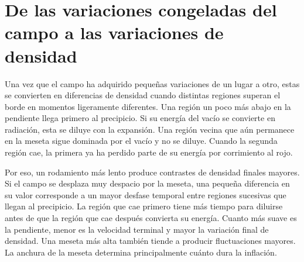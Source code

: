 \begin{classroomqa}
\end{classroomqa}

\begin{classroomqa}
\end{classroomqa}

\section{De las variaciones congeladas del campo a las variaciones de densidad}

Una vez que el campo ha adquirido pequeñas variaciones de un lugar a otro, estas se convierten en diferencias de densidad cuando distintas regiones superan el borde en momentos ligeramente diferentes. Una región un poco más abajo en la pendiente llega primero al precipicio. Si su energía del vacío se convierte en radiación, esta se diluye con la expansión. Una región vecina que aún permanece en la meseta sigue dominada por el vacío y no se diluye. Cuando la segunda región cae, la primera ya ha perdido parte de su energía por corrimiento al rojo.

Por eso, un rodamiento más lento produce contrastes de densidad finales mayores. Si el campo se desplaza muy despacio por la meseta, una pequeña diferencia en su valor corresponde a un mayor desfase temporal entre regiones sucesivas que llegan al precipicio. La región que cae primero tiene más tiempo para diluirse antes de que la región que cae después convierta su energía. Cuanto más suave es la pendiente, menor es la velocidad terminal y mayor la variación final de densidad. Una meseta más alta también tiende a producir fluctuaciones mayores. La anchura de la meseta determina principalmente cuánto dura la inflación.

